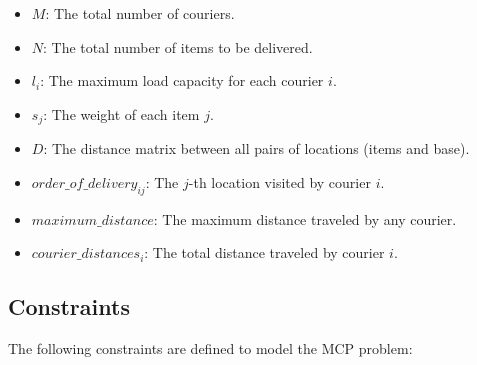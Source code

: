 \documentclass{article}
\begin{document}
\begin{itemize}
    \item \( M \): The total number of couriers.
    \item \( N \): The total number of items to be delivered.
    \item \( l_i \): The maximum load capacity for each courier \( i \).
    \item \( s_j \): The weight of each item \( j \).
    \item \( D \): The distance matrix between all pairs of locations (items and base).
    \item \( order\_of\_delivery_{ij} \): The \( j \)-th location visited by courier \( i \).
    \item \( maximum\_distance \): The maximum distance traveled by any courier.
    \item \( courier\_distances_i \): The total distance traveled by courier \( i \).
\end{itemize}

\subsection{Constraints}

The following constraints are defined to model the MCP problem:
\end{document}
